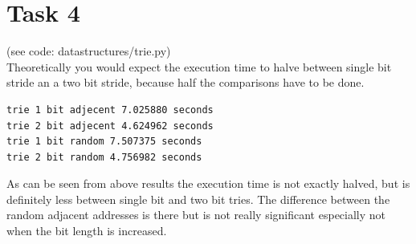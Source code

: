 \documentclass{article}
\begin{document}
\section{Task 4}
(see code: datastructures/trie.py) \\
Theoretically you would expect the execution time to halve between single bit stride an a two bit stride, because half the comparisons have to be done.

\begin{verbatim}
trie 1 bit adjecent 7.025880 seconds
trie 2 bit adjecent 4.624962 seconds
trie 1 bit random 7.507375 seconds
trie 2 bit random 4.756982 seconds
\end{verbatim}

As can be seen from above results the execution time is not exactly halved, but is definitely less between single bit and two bit tries. The difference between the random adjacent addresses is there but is not really significant especially not when the bit length is increased.
\end{document}
